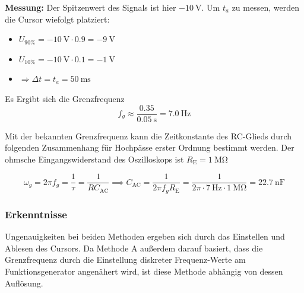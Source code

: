 \textbf{Messung:} Der Spitzenwert des Signals ist hier $\SI{-10}{\volt}$. Um
$t_a$ zu messen, werden die Cursor wiefolgt platziert:
\begin{itemize}[noitemsep]
	\item $U_{90\%} = \SI{-10}{\volt}\cdot 0.9 = \SI{-9}{\volt}$
	\item $U_{10\%} = \SI{-10}{\volt}\cdot 0.1 = \SI{-1}{\volt}$
	\item $\Rightarrow \Delta t = t_a = \SI{50}{\ms}$
\end{itemize}

Es Ergibt sich die Grenzfrequenz
\[ f_g \approx \frac{0.35}{\SI{0.05}{\second}} = \SI{7.0}{\hertz}\]

\marginref{\ref{itm:2-P2-3}}

Mit der bekannten Grenzfrequenz kann die Zeitkonstante des RC-Glieds durch folgenden Zusammenhang für Hochpässe erster Ordnung bestimmt werden. Der ohmsche Eingangswiderstand des Oszilloskops ist $R_\mathrm{E} = \SI{1}{\mega\ohm}$

\[
	\omega_g = 2\pi f_g = \frac{1}{\tau} = \frac{1}{RC_\mathrm{AC}} \implies C_\mathrm{AC} = \frac{1}{2\pi f_g R_\mathrm{E}} = \frac{1}{2\pi\cdot \SI{7}{\hertz}\cdot\SI{1}{\mega\ohm}} = \SI{22.7}{\nano\farad}
\]

\subsubsection{Erkenntnisse}

Ungenauigkeiten bei beiden Methoden ergeben sich durch das Einstellen und Ablesen des Cursors. Da Methode A außerdem darauf basiert, dass die Grenzfrequenz durch die Einstellung diskreter Frequenz-Werte am Funktionsgenerator angenähert wird, ist diese Methode abhängig von dessen Auflösung.
